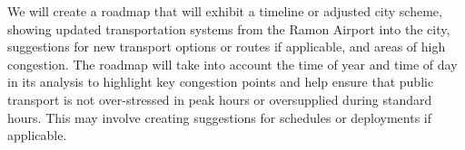 \documentclass[12pt]{article}                         %
\begin{document}
We will create a roadmap that will exhibit a timeline or adjusted city scheme, showing updated transportation systems from the Ramon Airport into the city, suggestions for new transport options or routes if applicable, and areas of high congestion. The roadmap will take into account the time of year and time of day in its analysis to highlight key congestion points and help ensure that public transport is not over-stressed in peak hours or oversupplied during standard hours. This may involve creating suggestions for schedules or deployments if applicable.

\newpage


\end{document}
